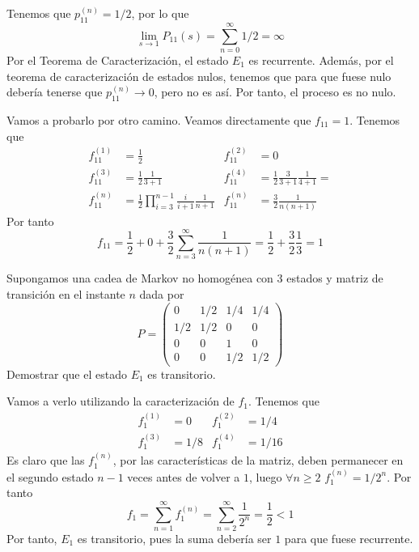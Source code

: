 \documentclass[twoside]{article}
\begin{document}
\begin{solucion}
Tenemos que $p_{11}^{(n)}=1/2$, por lo que
$$
\lim_{s\to 1} P_{11}(s)= \sum_{n=0}^\infty 1/2 = \infty
$$
Por el Teorema de Caracterización, el estado $E_1$ es recurrente. Además, por el teorema de caracterización de estados nulos, tenemos que para que fuese nulo debería tenerse que $p_{11}^{(n)}\to0$, pero no es así. Por tanto, el proceso es no nulo.

Vamos a probarlo por otro camino. Veamos directamente que $f_{11}=1$. Tenemos que
\begin{align*}
f_{11}^{(1)} &= \frac{1}{2}& f_{11}^{(2)} &= 0\\
f_{11}^{(3)} &= \frac{1}{2} \frac{1}{3+1} & f_{11}^{(4)} &= \frac{1}{2} \frac{3}{3+1}\frac{1}{4+1} = \\
f_{11}^{(n)} &= \frac{1}{2}\prod_{i=3}^{n-1}\frac{i}{i+1}\frac{1}{n+1} & f_{11}^{(n)} &= \frac{3}{2}\frac{1}{n(n+1)} 
\end{align*}
Por tanto
$$
f_{11} = \frac{1}{2} + 0 + \frac{3}{2}\sum_{n=3}^\infty \frac{1}{n(n+1)} = \frac{1}{2} + \frac{3}{2}\frac{1}{3} = 1
$$
\end{solucion}
\newpage


\begin{ejercicio}{8}Supongamos una cadea de Markov no homogénea con $3$ estados y matriz de transición en el instante $n$ dada por
$$
P=
\begin{pmatrix}
0 & 1/2 & 1/4 & 1/4\\
1/2 & 1/2 & 0 & 0 \\
0 & 0& 1 &0\\
0 &0 & 1/2& 1/2
\end{pmatrix}
$$
Demostrar que el estado $E_1$ es transitorio.
\end{ejercicio}

\begin{solucion}
Vamos a verlo utilizando la caracterización de $f_1$. Tenemos que
\begin{align*}
f_1^{(1)} &= 0 & f_1^{(2)} &= 1/4\\
f_1^{(3)} &= 1/8 & f_1^{(4)} &= 1/16
\end{align*}
Es claro que las $f_1^{(n)}$, por las características de la matriz, deben permanecer en el segundo estado $n-1$ veces antes de volver a $1$, luego $\forall n\geq 2$ $f_1^{(n)}=1/2^n$. Por tanto
$$
f_1 = \sum_{n=1}^\infty f_1^{(n)} = \sum_{n=2}^\infty \frac{1}{2^n} = \frac{1}{2} < 1
$$
Por tanto, $E_1$ es transitorio, pues la suma debería ser $1$ para que fuese recurrente.
\end{solucion}
\newpage
\end{document}
